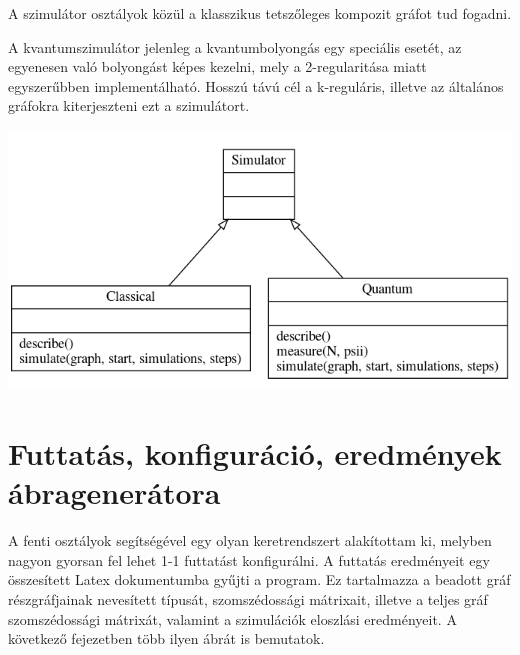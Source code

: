 A szimulátor osztályok közül a klasszikus tetszőleges kompozit gráfot tud
fogadni.


A kvantumszimulátor jelenleg a kvantumbolyongás egy speciális esetét, az egyenesen való bolyongást képes kezelni, mely a 2-regularitása miatt egyszerűbben implementálható. Hosszú távú cél a k-reguláris, illetve az általános gráfokra kiterjeszteni ezt a szimulátort.

\begin{center}
  \includegraphics[width=0.8\linewidth]{./figures/program/simulator.png}
\end{center}

\section{Futtatás, konfiguráció, eredmények ábragenerátora}


A fenti osztályok segítségével egy olyan keretrendszert alakítottam ki, melyben
nagyon gyorsan fel lehet 1-1 futtatást konfigurálni. A futtatás eredményeit egy
összesített Latex dokumentumba gyűjti a program. Ez tartalmazza a beadott gráf
részgráfjainak nevesített típusát, szomszédossági mátrixait, illetve a teljes
gráf szomszédossági mátrixát, valamint a szimulációk eloszlási eredményeit. A
következő fejezetben több ilyen ábrát is bemutatok.
